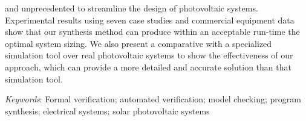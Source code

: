 and unprecedented to streamline the design of photovoltaic systems. Experimental results using seven case studies and commercial equipment data show that our synthesis method can produce within an acceptable run-time the optimal system sizing. We also present a comparative with a specialized simulation tool over real photovoltaic systems to show the effectiveness of our approach, which can provide a more detailed and accurate solution than that simulation tool.



\textit{Keywords}: Formal verification; automated verification; model checking; program synthesis; electrical systems; solar photovoltaic systems
